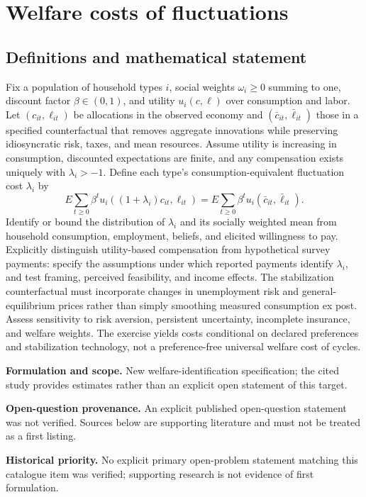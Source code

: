 \documentclass[11pt]{article}
\begin{document}
\section*{Welfare costs of fluctuations}\label{30007518}
\subsection{Definitions and mathematical statement}
Fix a population of household types \(i\), social weights \(\omega_i\ge0\) summing to one, discount factor \(\beta\in(0,1)\), and utility \(u_i(c,\ell)\) over consumption and labor. Let \((c_{it},\ell_{it})\) be allocations in the observed economy and \((\bar c_{it},\bar\ell_{it})\) those in a specified counterfactual that removes aggregate innovations while preserving idiosyncratic risk, taxes, and mean resources. Assume utility is increasing in consumption, discounted expectations are finite, and any compensation exists uniquely with \(\lambda_i>-1\). Define each type’s consumption-equivalent fluctuation cost \(\lambda_i\) by
\[
E\sum_{t\ge0}\beta^t u_i((1+\lambda_i)c_{it},\ell_{it})
=E\sum_{t\ge0}\beta^t u_i(\bar c_{it},\bar\ell_{it}).
\]
Identify or bound the distribution of \(\lambda_i\) and its socially weighted mean from household consumption, employment, beliefs, and elicited willingness to pay. Explicitly distinguish utility-based compensation from hypothetical survey payments: specify the assumptions under which reported payments identify \(\lambda_i\), and test framing, perceived feasibility, and income effects. The stabilization counterfactual must incorporate changes in unemployment risk and general-equilibrium prices rather than simply smoothing measured consumption ex post. Assess sensitivity to risk aversion, persistent uncertainty, incomplete insurance, and welfare weights. The exercise yields costs conditional on declared preferences and stabilization technology, not a preference-free universal welfare cost of cycles.

\par\textbf{Formulation and scope.} New welfare-identification specification; the cited study provides estimates rather than an explicit open statement of this target.

\par\textbf{Open-question provenance.} An explicit published open-question statement was not verified. Sources below are supporting literature and must not be treated as a first listing.

\par\textbf{Historical priority.} No explicit primary open-problem statement matching this catalogue item was verified; supporting research is not evidence of first formulation.
\end{document}
